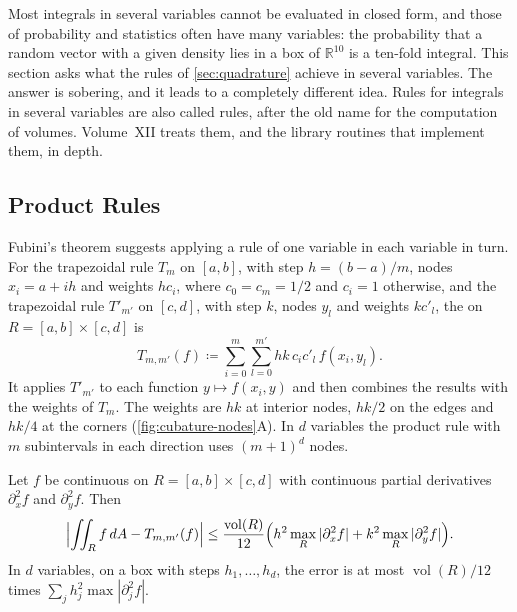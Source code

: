 Most integrals in several variables cannot be evaluated in closed form, and those of probability and statistics often have many variables: the probability that a random vector with a given density lies in a box of $\mathbb R^{10}$ is a ten-fold integral. This section asks what the rules of \cref{sec:quadrature} achieve in several variables. The answer is sobering, and it leads to a completely different idea. Rules for integrals in several variables are also called  rules, after the old name for the computation of volumes. Volume~XII treats them, and the library routines that implement them, in depth.

\subsection{Product Rules}

Fubini's theorem suggests applying a rule of one variable in each variable in turn. For the trapezoidal rule $T_m$ on $[a,b]$, with step $h=(b-a)/m$, nodes $x_i=a+ih$ and weights $hc_i$, where $c_0=c_m=1/2$ and $c_i=1$ otherwise, and the trapezoidal rule $T'_{m'}$ on $[c,d]$, with step $k$, nodes $y_l$ and weights $kc'_l$, the  on $R=[a,b]\times[c,d]$ is
\[
T_{m,m'}(f)\coloneqq\sum_{i=0}^m\sum_{l=0}^{m'}hk\,c_ic'_l\,f(x_i,y_l).
\]
It applies $T'_{m'}$ to each function $y\mapsto f(x_i,y)$ and then combines the results with the weights of $T_m$. The weights are $hk$ at interior nodes, $hk/2$ on the edges and $hk/4$ at the corners (\cref{fig:cubature-nodes}A). In $d$ variables the product rule with $m$ subintervals in each direction uses $(m+1)^d$ nodes.

\begin{proposition}
\label{prop:product-trapezoid-error}
Let $f$ be continuous on $R=[a,b]\times[c,d]$ with continuous partial derivatives $\partial_x^2f$ and $\partial_y^2f$. Then
\[
\Bigl|\iint_Rf\,dA-T_{m,m'}(f)\Bigr|\le\frac{\operatorname{vol}(R)}{12}\Bigl(h^2\max_R|\partial_x^2f|+k^2\max_R|\partial_y^2f|\Bigr).
\]
In $d$ variables, on a box with steps $h_1,\ldots,h_d$, the error is at most $\operatorname{vol}(R)/12$ times $\sum_jh_j^2\max|\partial_j^2f|$.
\end{proposition}


